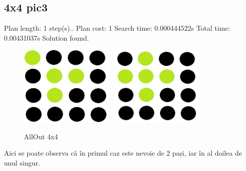 \subsection{4x4 pic3} \newline
\newline
[t=0.00431037s, 10292 KB] Plan length: 1 step(s)..
\newline
[t=0.00431037s, 10292 KB] Plan cost: 1
\newline
[t=0.00431037s, 10292 KB] Search time: 0.000444522s
\newline
[t=0.00431037s, 10292 KB] Total time: 0.00431037s
\newline
Solution found.
\newline
\newline
  \newline
  \newline
\begin{figure}[h]
\centering
 \includegraphics[width=0.4\textwidth]{text/images/pic2.jpeg}\
  \hfill
  \includegraphics[width=0.4\textwidth]{text/images/pic3.jpeg}\
   \newline
    \caption{AllOut 4x4}
\end{figure} \newline \newline
\newline
Aici se poate observa că în primul caz este nevoie de 2 pași, iar în al doilea de unul singur.